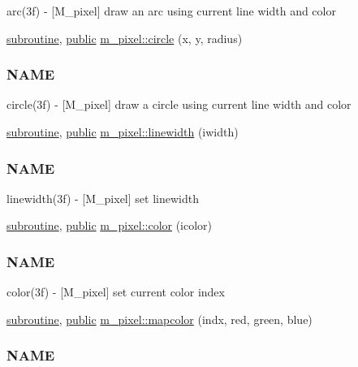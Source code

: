 \begin{DoxyCompactItemize}
\begin{DoxyCompactList}
arc(3f) -\/ \mbox{[}M\+\_\+pixel\mbox{]} draw an arc using current line width and color \end{DoxyCompactList}\item 
\hyperlink{M__stopwatch_83_8txt_acfbcff50169d691ff02d4a123ed70482}{subroutine}, \hyperlink{M__stopwatch_83_8txt_a2f74811300c361e53b430611a7d1769f}{public} \hyperlink{namespacem__pixel_ab3b12cc498ed490014aa5fcc0bb278d2}{m\+\_\+pixel\+::circle} (x, y, radius)
\begin{DoxyCompactList}\small\item\em \subsubsection*{N\+A\+ME}

circle(3f) -\/ \mbox{[}M\+\_\+pixel\mbox{]} draw a circle using current line width and color \end{DoxyCompactList}\item 
\hyperlink{M__stopwatch_83_8txt_acfbcff50169d691ff02d4a123ed70482}{subroutine}, \hyperlink{M__stopwatch_83_8txt_a2f74811300c361e53b430611a7d1769f}{public} \hyperlink{namespacem__pixel_a16379e283aaa99e2e0ba1eb26e93452d}{m\+\_\+pixel\+::linewidth} (iwidth)
\begin{DoxyCompactList}\small\item\em \subsubsection*{N\+A\+ME}

linewidth(3f) -\/ \mbox{[}M\+\_\+pixel\mbox{]} set linewidth \end{DoxyCompactList}\item 
\hyperlink{M__stopwatch_83_8txt_acfbcff50169d691ff02d4a123ed70482}{subroutine}, \hyperlink{M__stopwatch_83_8txt_a2f74811300c361e53b430611a7d1769f}{public} \hyperlink{namespacem__pixel_a334bde41bc7b2db19b950b1271ba7463}{m\+\_\+pixel\+::color} (icolor)
\begin{DoxyCompactList}\small\item\em \subsubsection*{N\+A\+ME}

color(3f) -\/ \mbox{[}M\+\_\+pixel\mbox{]} set current color index \end{DoxyCompactList}\item 
\hyperlink{M__stopwatch_83_8txt_acfbcff50169d691ff02d4a123ed70482}{subroutine}, \hyperlink{M__stopwatch_83_8txt_a2f74811300c361e53b430611a7d1769f}{public} \hyperlink{namespacem__pixel_a3422f51171f30979868a8075690da9f5}{m\+\_\+pixel\+::mapcolor} (indx, red, green, blue)
\begin{DoxyCompactList}\small\item\em \subsubsection*{N\+A\+ME}


\end{DoxyCompactList}
\end{DoxyCompactItemize}
